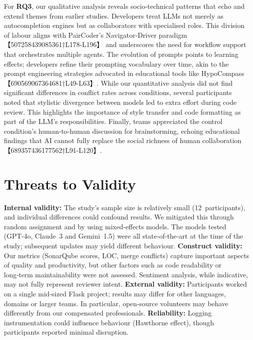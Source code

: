 \documentclass[conference]{IEEEtran}
\begin{document}
For \textbf{RQ3}, our qualitative analysis reveals socio‑technical patterns that echo and extend themes from earlier studies.  Developers treat LLMs not merely as autocompletion engines but as collaborators with specialised roles.  This division of labour aligns with PairCoder’s Navigator‑Driver paradigm 【507258439085361†L178-L196】 and underscores the need for workflow support that orchestrates multiple agents.  The evolution of prompts points to learning effects; developers refine their prompting vocabulary over time, akin to the prompt engineering strategies advocated in educational tools like HypoCompass 【690569067364681†L49-L63】.  While our quantitative analysis did not find significant differences in conflict rates across conditions, several participants noted that stylistic divergence between models led to extra effort during code review.  This highlights the importance of style transfer and code formatting as part of the LLM’s responsibilities.  Finally, teams appreciated the control condition’s human‑to‑human discussion for brainstorming, echoing educational findings that AI cannot fully replace the social richness of human collaboration 【689357436177562†L91-L120】.

\section{Threats to Validity}
\textbf{Internal validity:} The study’s sample size is relatively small (12 participants), and individual differences could confound results.  We mitigated this through random assignment and by using mixed‑effects models.  The models tested (GPT‑4o, Claude 3 and Gemini 1.5) were all state‑of‑the‑art at the time of the study; subsequent updates may yield different behaviour.  \textbf{Construct validity:} Our metrics (SonarQube scores, LOC, merge conflicts) capture important aspects of quality and productivity, but other factors such as code readability or long‑term maintainability were not assessed.  Sentiment analysis, while indicative, may not fully represent reviewer intent.  \textbf{External validity:} Participants worked on a single mid‑sized Flask project; results may differ for other languages, domains or larger teams.  In particular, open‑source volunteers may behave differently from our compensated professionals.  \textbf{Reliability:} Logging instrumentation could influence behaviour (Hawthorne effect), though participants reported minimal disruption.
\end{document}
